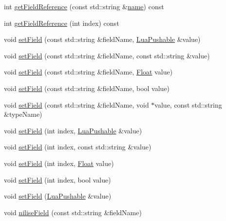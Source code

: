 \begin{DoxyCompactItemize}
\item 
int \hyperlink{classZeta_1_1LuaTable_ac25dfbe8ed541513df53b10d1a5aabfa}{get\+Field\+Reference} (const std\+::string \&\hyperlink{classZeta_1_1LuaReferenced_ad6f7a947b37382f9968f4a54bd718119}{name}) const 
\item 
int \hyperlink{classZeta_1_1LuaTable_a1dc9bc7777fd3ef0a462bb0bdc213383}{get\+Field\+Reference} (int index) const 
\item 
void \hyperlink{classZeta_1_1LuaTable_a2c44ea84bc5479c11e33a82a05298eec}{set\+Field} (const std\+::string \&field\+Name, \hyperlink{classZeta_1_1LuaPushable}{Lua\+Pushable} \&value)
\item 
void \hyperlink{classZeta_1_1LuaTable_aab965da35db04c5626db8a65687a2ae8}{set\+Field} (const std\+::string \&field\+Name, const std\+::string \&value)
\item 
void \hyperlink{classZeta_1_1LuaTable_a4a0d50b713f344bec172302fe4129a26}{set\+Field} (const std\+::string \&field\+Name, \hyperlink{namespaceZeta_a1e0a1265f9b3bd3075fb0fabd39088ba}{Float} value)
\item 
void \hyperlink{classZeta_1_1LuaTable_a1d61a28fc9258a17340dee8f06be55bb}{set\+Field} (const std\+::string \&field\+Name, bool value)
\item 
void \hyperlink{classZeta_1_1LuaTable_ae9378ab219462193654cd3b38b133122}{set\+Field} (const std\+::string \&field\+Name, void $\ast$value, const std\+::string \&type\+Name)
\item 
void \hyperlink{classZeta_1_1LuaTable_a2084235ff0ff723ca40e1e70f2f84a2d}{set\+Field} (int index, \hyperlink{classZeta_1_1LuaPushable}{Lua\+Pushable} \&value)
\item 
void \hyperlink{classZeta_1_1LuaTable_a635fc954e1f55a61478dad42eb3a73bd}{set\+Field} (int index, const std\+::string \&value)
\item 
void \hyperlink{classZeta_1_1LuaTable_a86d60ec46ab36d4b40b28b65161cd08c}{set\+Field} (int index, \hyperlink{namespaceZeta_a1e0a1265f9b3bd3075fb0fabd39088ba}{Float} value)
\item 
void \hyperlink{classZeta_1_1LuaTable_ab5270fab51fd1f60cb2e0f844d827341}{set\+Field} (int index, bool value)
\item 
void \hyperlink{classZeta_1_1LuaTable_ab50a4a9303e2c84f22a57ada48f1775d}{set\+Field} (\hyperlink{classZeta_1_1LuaPushable}{Lua\+Pushable} \&value)
\item 
void \hyperlink{classZeta_1_1LuaTable_a2352879fe4d248a06e75ab8b98bd43fb}{nilise\+Field} (const std\+::string \&field\+Name)
\item 

\end{DoxyCompactItemize}
